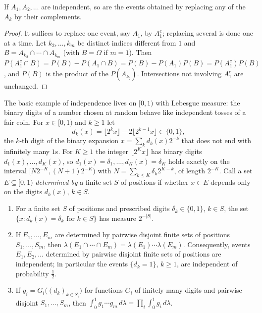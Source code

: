 \begin{lemma}\label{measure-theory:lemma-independent-complements}
If $A_1, A_2, \ldots$ are independent, so are the events obtained by replacing any of the $A_k$ by their complements.
\end{lemma}

\begin{proof}
It suffices to replace one event, say $A_1$, by $A_1^c$; replacing several is done one at a time. Let $k_2, \ldots, k_m$ be distinct indices different from $1$ and $B = A_{k_2} \cap \cdots \cap A_{k_m}$ (with
$B = \Omega$ if $m = 1$). Then $P(A_1^c \cap B) = P(B) - P(A_1 \cap B) = P(B) - P(A_1)P(B) = P(A_1^c)P(B)$, and $P(B)$ is the product of the $P(A_{k_j})$. Intersections not involving $A_1^c$ are unchanged.
\end{proof}

The basic example of independence lives on $[0, 1)$ with Lebesgue measure: the binary digits of a number chosen at random behave like independent tosses of a fair coin. For $x \in [0, 1)$ and $k \geq 1$ let
\[
d_k(x) = \lfloor 2^kx\rfloor - 2\lfloor 2^{k-1}x\rfloor \in \{0, 1\},
\]
the $k$-th digit of the binary expansion $x = \sum_kd_k(x)2^{-k}$ that does not end with infinitely many $1$s. For $K \geq 1$ the integer $\lfloor 2^Kx\rfloor$ has binary digits $d_1(x), \ldots, d_K(x)$, so
$d_1(x) = \delta_1, \ldots, d_K(x) = \delta_K$ holds exactly on the interval $[N2^{-K}, (N + 1)2^{-K})$ with $N = \sum_{k \leq K}\delta_k2^{K-k}$, of length $2^{-K}$. Call a set $E \subseteq [0, 1)$
\emph{determined by} a finite set $S$ of positions if whether $x \in E$ depends only on the digits $d_k(x)$, $k \in S$.

\begin{lemma}\label{measure-theory:lemma-binary-digits}
\begin{enumerate}
\item For a finite set $S$ of positions and prescribed digits $\delta_k \in \{0, 1\}$, $k \in S$, the set $\{x : d_k(x) = \delta_k \text{ for } k \in S\}$ has measure $2^{-|S|}$.
\item If $E_1, \ldots, E_m$ are determined by pairwise disjoint finite sets of positions $S_1, \ldots, S_m$, then $\lambda(E_1 \cap \cdots \cap E_m) = \lambda(E_1) \cdots \lambda(E_m)$. Consequently, events
$E_1, E_2, \ldots$ determined by pairwise disjoint finite sets of positions are independent; in particular the events $\{d_k = 1\}$, $k \geq 1$, are independent of probability $\frac12$.
\item If $g_i = G_i\bigl((d_k)_{k \in S_i}\bigr)$ for functions $G_i$ of finitely many digits and pairwise disjoint $S_1, \ldots, S_m$, then $\int_0^1g_1 \cdots g_m\,d\lambda = \prod_i\int_0^1g_i\,d\lambda$.
\end{enumerate}
\end{lemma}

